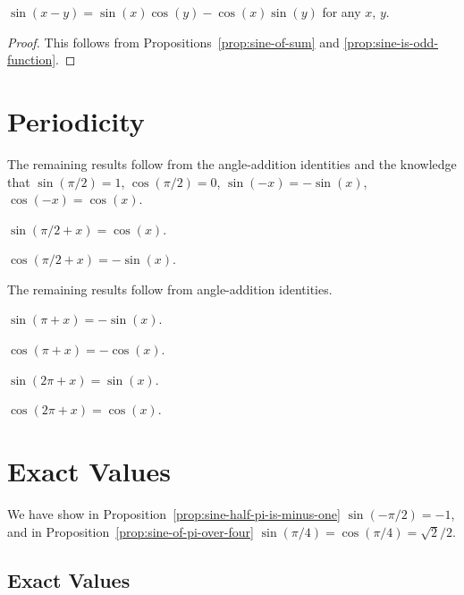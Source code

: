 \begin{proposition}
$\sin(x-y) = \sin(x)\cos(y) - \cos(x)\sin(y)$ for any $x$, $y$.
\end{proposition}

\begin{proof}
This follows from Propositions~\ref{prop:sine-of-sum} and \ref{prop:sine-is-odd-function}.
\end{proof}

\section{Periodicity}

The remaining results follow from the angle-addition identities and the
knowledge that $\sin(\pi/2)=1$, $\cos(\pi/2)=0$, $\sin(-x)=-\sin(x)$, $\cos(-x)=\cos(x)$.

\begin{proposition}
$\sin(\pi/2 + x) = \cos(x)$.
\end{proposition}

\begin{proposition}
$\cos(\pi/2 + x) = -\sin(x)$.
\end{proposition}

The remaining results follow from angle-addition identities.

\begin{proposition}
$\sin(\pi + x) = -\sin(x)$.
\end{proposition}

\begin{proposition}
$\cos(\pi + x) = -\cos(x)$.
\end{proposition}

\begin{proposition}
$\sin(2\pi + x) = \sin(x)$.
\end{proposition}

\begin{proposition}
$\cos(2\pi + x) = \cos(x)$.
\end{proposition}

\section{Exact Values}

We have show in Proposition~\ref{prop:sine-half-pi-is-minus-one} $\sin(-\pi/2)=-1$,
and in Proposition~\ref{prop:sine-of-pi-over-four} $\sin(\pi/4)=\cos(\pi/4)=\sqrt{2}/2$.

\subsection{Exact Values}

